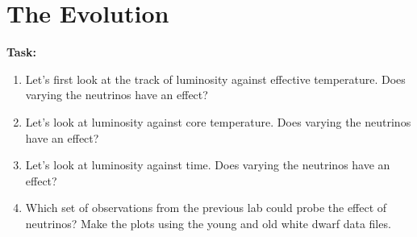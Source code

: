 \documentclass{article}
\begin{document}
\section{The Evolution}

\textbf{Task:}\vspace{-1em}
\begin{enumerate}
 \setlength\itemsep{0em}
\item Let's first look at the track of luminosity against effective temperature.  Does varying the neutrinos have an effect?
\item Let's look at luminosity against core temperature.  Does varying the neutrinos have an effect?
\item Let's look at luminosity against time. 
 Does varying the neutrinos have an effect?
 \item 
Which set of observations from the previous lab could probe the effect of neutrinos?  Make the plots using the young and old white dwarf data files.
\end{enumerate}

\end{document}
